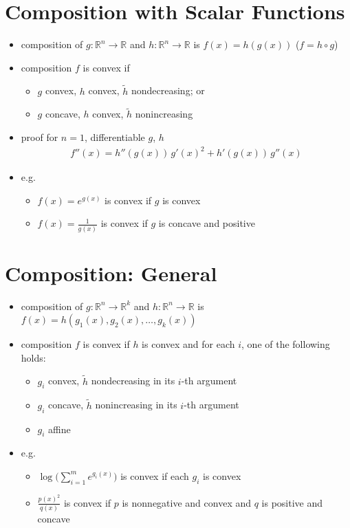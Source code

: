 \documentclass[11pt]{extarticle}
\newcommand{\ds}{\displaystyle}
\theoremstyle{definition}
\begin{document}
\newpage

\section*{Composition with Scalar Functions}

\begin{itemize}
  \item composition of $g:\mathbb{R}^n\to\mathbb{R}$ and $h:\mathbb{R}^n\to\mathbb{R}$ is $\ds f(x) = h(g(x))$ ($\ds f = h\circ g$)
  \item composition $f$ is convex if
    \begin{itemize}
      \item $g$ convex, $h$ convex, $\ds\widetilde{h}$ nondecreasing; or
      \item $g$ concave, $h$ convex, $\ds\widetilde{h}$ nonincreasing
    \end{itemize}
  \item proof for $n = 1$, differentiable $g$, $h$
    \begin{align*}
      f''(x) = h''(g(x))\,g'(x)^2 + h'(g(x))\,g''(x)
    \end{align*}
  \item e.g.
    \begin{itemize}
      \item $f(x) = e^{g(x)}$ is convex if $g$ is convex
      \item $\ds f(x) = \frac{1}{g(x)}$ is convex if $g$ is concave and positive
    \end{itemize}
\end{itemize}

\newpage

\section*{Composition: General}

\begin{itemize}
  \item composition of $g:\mathbb{R}^n\to\mathbb{R}^k$ and $h:\mathbb{R}^n\to\mathbb{R}$ is $\ds f(x) = h(g_1(x), g_2(x),\ldots, g_k(x))$
  \item composition $f$ is convex if $h$ is convex and for each $i$, one of the following holds:
    \begin{itemize}
      \item $g_i$ convex, $\ds\widetilde{h}$ nondecreasing in its $i$-th argument
      \item $g_i$ concave, $\ds\widetilde{h}$ nonincreasing in its $i$-th argument
      \item $g_i$ affine
    \end{itemize}
  \item e.g.
    \begin{itemize}
      \item $\ds\log\Big(\sum_{i = 1}^m e^{g_i(x)}\Big)$ is convex if each $g_i$ is convex
      \item $\ds\frac{p(x)^2}{q(x)}$ is convex if $p$ is nonnegative and convex and $q$ is positive and concave
    \end{itemize}
\end{itemize}
\end{document}
